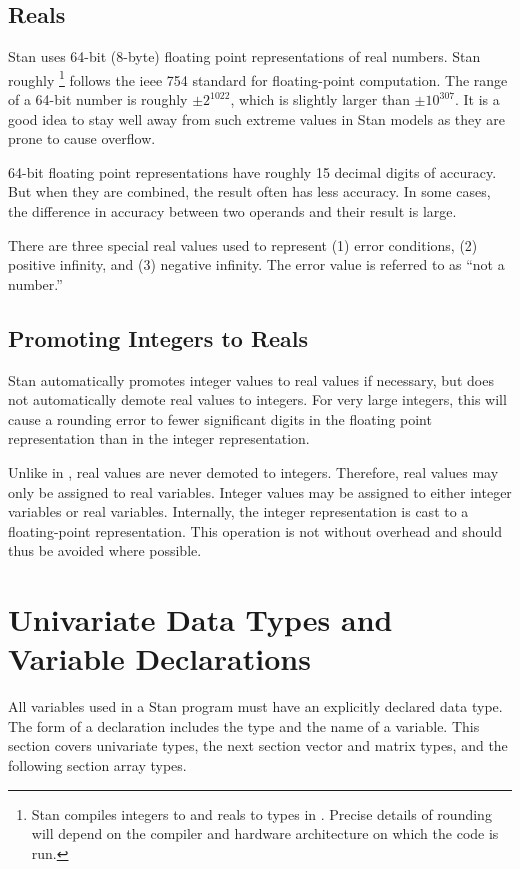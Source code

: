 \subsection{Reals}

Stan uses 64-bit (8-byte) floating point representations of real
numbers.  Stan roughly%
%
\footnote{Stan compiles integers to  and reals to
   types in \Cpp.  Precise details of rounding will depend
  on the compiler and hardware architecture on which the code is run.}
%
follows the {\sc ieee} 754 standard for floating-point computation.
The range of a 64-bit number is roughly $\pm 2^{1022}$, which is
slightly larger than $\pm 10^{307}$.  It is a good idea to stay well
away from such extreme values in Stan models as they are prone to
cause overflow.

64-bit floating point representations have roughly 15 decimal digits
of accuracy.  But when they are combined, the result often has less
accuracy.  In some cases, the difference in accuracy between two
operands and their result is large.

There are three special real values used to represent (1) error
conditions, (2) positive infinity, and (3) negative infinity.  The
error value is referred to as ``not a number.''

\subsection{Promoting Integers to Reals}

Stan automatically promotes integer values to real values if
necessary, but does not automatically demote real values to integers.
For very large integers, this will cause a rounding error to fewer
significant digits in the floating point representation than in the
integer representation.

Unlike in \Cpp, real values are never demoted to integers.  Therefore,
real values may only be assigned to real variables.  Integer values
may be assigned to either integer variables or real variables.
Internally, the integer representation is cast to a floating-point
representation.  This operation is not without overhead and should
thus be avoided where possible.


\section{Univariate Data Types and Variable Declarations}

All variables used in a Stan program must have an explicitly declared
data type.  The form of a declaration includes the type and the name
of a variable.  This section covers univariate types, the next section
vector and matrix types, and the following section array types.

